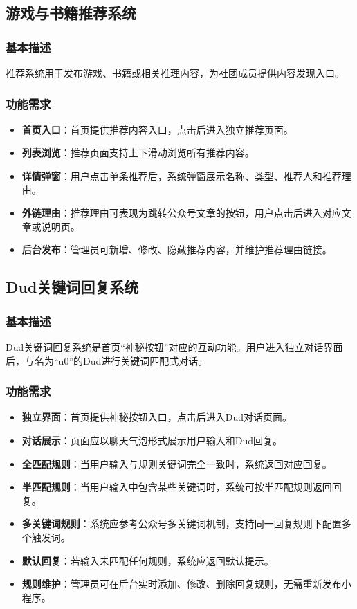 \documentclass[a4paper,12pt]{article}
\begin{document}
\subsection{游戏与书籍推荐系统}

\subsubsection{基本描述}
推荐系统用于发布游戏、书籍或相关推理内容，为社团成员提供内容发现入口。

\subsubsection{功能需求}
\begin{itemize}
    \item \textbf{首页入口}：首页提供推荐内容入口，点击后进入独立推荐页面。
    \item \textbf{列表浏览}：推荐页面支持上下滑动浏览所有推荐内容。
    \item \textbf{详情弹窗}：用户点击单条推荐后，系统弹窗展示名称、类型、推荐人和推荐理由。
    \item \textbf{外链理由}：推荐理由可表现为跳转公众号文章的按钮，用户点击后进入对应文章或说明页。
    \item \textbf{后台发布}：管理员可新增、修改、隐藏推荐内容，并维护推荐理由链接。
\end{itemize}

\subsection{Dud关键词回复系统}

\subsubsection{基本描述}
Dud关键词回复系统是首页“神秘按钮”对应的互动功能。用户进入独立对话界面后，与名为“u0”的Dud进行关键词匹配式对话。

\subsubsection{功能需求}
\begin{itemize}
    \item \textbf{独立界面}：首页提供神秘按钮入口，点击后进入Dud对话页面。
    \item \textbf{对话展示}：页面应以聊天气泡形式展示用户输入和Dud回复。
    \item \textbf{全匹配规则}：当用户输入与规则关键词完全一致时，系统返回对应回复。
    \item \textbf{半匹配规则}：当用户输入中包含某些关键词时，系统可按半匹配规则返回回复。
    \item \textbf{多关键词规则}：系统应参考公众号多关键词机制，支持同一回复规则下配置多个触发词。
    \item \textbf{默认回复}：若输入未匹配任何规则，系统应返回默认提示。
    \item \textbf{规则维护}：管理员可在后台实时添加、修改、删除回复规则，无需重新发布小程序。
\end{itemize}
\end{document}
